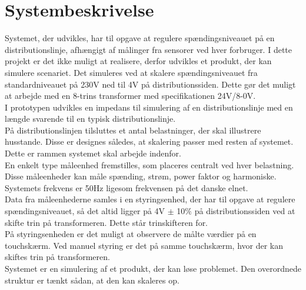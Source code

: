 
\section{Systembeskrivelse}

Systemet, der udvikles, har til opgave at regulere spændingsniveauet på en distributionslinje, afhængigt af målinger fra sensorer ved hver forbruger.
I dette projekt er det ikke muligt at realisere, derfor udvikles et produkt, der kan simulere scenariet. Det simuleres ved at skalere spændingsniveauet fra standardniveauet på 230V ned til 4V på distributionssiden. Dette gør det muligt at arbejde med en 8-trins transformer med specifikationen 24V/8-0V.\\
I prototypen udvikles en impedans til simulering af en distributionslinje med en længde svarende til en typisk distributionslinje.\\
På distributionslinjen tilsluttes et antal belastninger, der skal illustrere husstande. Disse er designes således, at skalering passer med resten af systemet. Dette er rammen systemet skal arbejde indenfor. \\
En enkelt type måleenhed fremstilles, som placeres centralt ved hver belastning. Disse måleenheder kan måle spænding, strøm, power faktor og harmoniske.  Systemets frekvens er 50Hz ligesom frekvensen på det danske elnet.\\
Data fra måleenhederne samles i en styringsenhed, der har til opgave at regulere spændingsniveauet, så det altid ligger på 4V $\pm$ 10$\%$ på distributionssiden ved at skifte trin på transformeren. Dette står trinskifteren for.\\
På styringsenheden er det muligt at observere de målte værdier på en touchskærm. Ved manuel styring er det på samme touchskærm, hvor der kan skiftes trin på transformeren.\\
Systemet er en simulering af et produkt, der kan løse problemet. Den overordnede struktur er tænkt sådan, at den kan skaleres op.\\

